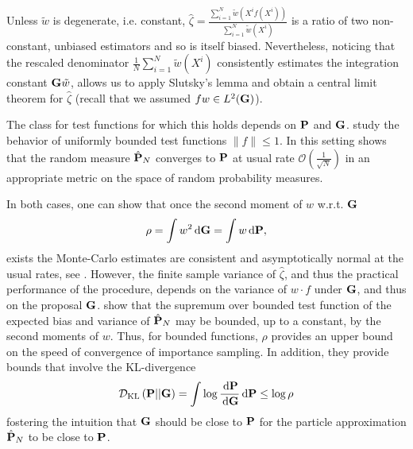 Unless $\tilde w$ is degenerate, i.e. constant, $\hat\zeta = \frac{\sum_{i = 1}^N \tilde w (X^{i} f(X^{i}))}{\sum_{i = 1}^{N} \tilde w(X^{i})}$ is a ratio of two non-constant, unbiased estimators and so is itself biased. Nevertheless, noticing that the rescaled denominator $\frac{1}{N} \sum_{i = 1}^{N} \tilde w(X^{i})$ consistently estimates the integration constant $\G \tilde w$, allows us to apply Slutsky's lemma and obtain a central limit theorem for $\hat \zeta$ (recall that we assumed $fw \in L^{2}(\G)$).


The class for test functions for which this holds depends on $\P$ and $\G$. \citep{Agapiou2017Importance} study the behavior of uniformly bounded test functions $\lVert f \rVert \leq 1$. 
In this setting \citep{Agapiou2017Importance} shows that the random measure $\hat \P_N$ converges to $\P$ at usual rate $\mathcal O\left(\frac 1 {\sqrt{N}}\right)$ in an appropriate metric on the space of random probability measures. 

In both cases, one can show that once the second moment of $w$ w.r.t. $\G$ 
$$
\rho = \int w^{2}\d\G = \int w \d \P,
$$
exists the Monte-Carlo estimates are consistent and asymptotically normal at the usual rates, see \citep[Chapter 8]{Chopin2020Introduction}.
However, the finite sample variance of $\hat\zeta$, and thus the practical performance of the procedure, depends on the variance of $w\cdot f$ under $\G$, and thus on the proposal $\G$. \citep{Agapiou2017Importance} show that the supremum over bounded test function of the expected bias and variance of $\hat \P_N$ may be bounded, up to a constant, by the second moments of $w$. Thus, for bounded functions, $\rho$ provides an upper bound on the speed of convergence of importance sampling. In addition, they provide bounds that involve the KL-divergence 
$$
\Dkl{\P}{\G} = \int \log \frac{\d \P}{\d \G} \d \P \leq \log \rho
$$
fostering the intuition that $\G$ should be close to $\P$ for the particle approximation $\hat\P_{N}$ to be close to $\P$.

